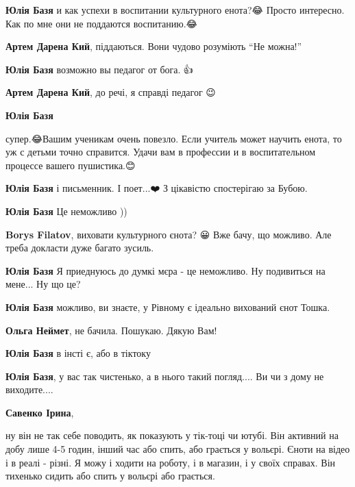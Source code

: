 \begin{itemize} %
\textbf{Юлія Базя} и как успехи в воспитании культурного енота?😂 Просто интересно. Как по мне они не поддаются воспитанию.😂

\begin{itemize} %
\textbf{Артем Дарена Кий}, піддаються. Вони чудово розуміють \enquote{Не можна!}

\textbf{Юлія Базя} возможно вы педагог от бога.💪👍😂

\textbf{Артем Дарена Кий}, до речі, я справді педагог 😉

\textbf{Юлія Базя} 

супер.😂Вашим ученикам очень повезло. Если учитель может научить енота, то уж с
детьми точно справится. Удачи вам в профессии и в воспитательном процессе
вашего пушистика.😊

\textbf{Юлія Базя} і письменник. І поет...❤️
З цікавістю спостерігаю за Бубою.

\end{itemize} %

\textbf{Юлія Базя} Це неможливо ))

\begin{itemize} %
\textbf{Borys Filatov}, виховати культурного єнота? 😀 Вже бачу, що можливо. Але треба докласти дуже багато зусиль.

\textbf{Юлія Базя} Я приеднуюсь до думкі мєра - це неможливо. Ну подивиться на мене... Ну що це? 🫣
\end{itemize} %

\textbf{Юлія Базя} можливо, ви знаєте, у Рівному є ідеально вихований єнот Тошка.

\begin{itemize} %
\textbf{Ольга Неймет}, не бачила. Пошукаю. Дякую Вам!

\textbf{Юлія Базя} в інсті є, або в тіктоку
\end{itemize} %

\textbf{Юлія Базя}, у вас так чистенько, а в нього такий погляд.... Ви чи з дому не виходите....

\begin{itemize} %
\textbf{Савенко Ірина}, 

ну він не так себе поводить, як показують у тік-тоці чи ютубі. Він активний на
добу лише 4-5 годин, інший час або спить, або грається у вольєрі. Єноти на
відео і в реалі - різні. Я можу і ходити на роботу, і в магазин, і у своїх
справах. Він тихенько сидить або спить у вольєрі або грається.


\end{itemize}
\end{itemize}
